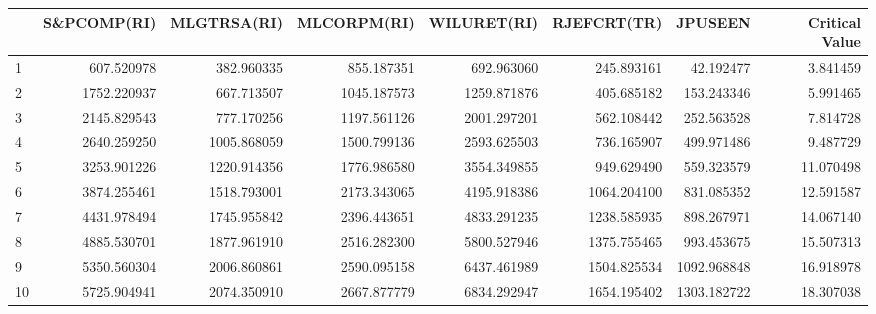 \begin{tabular}{lrrrrrrr}
\toprule
{} &  S\&PCOMP(RI) &  MLGTRSA(RI) &  MLCORPM(RI) &  WILURET(RI) &  RJEFCRT(TR) &      JPUSEEN &  Critical Value \\
\midrule
1  &   607.520978 &   382.960335 &   855.187351 &   692.963060 &   245.893161 &    42.192477 &        3.841459 \\
2  &  1752.220937 &   667.713507 &  1045.187573 &  1259.871876 &   405.685182 &   153.243346 &        5.991465 \\
3  &  2145.829543 &   777.170256 &  1197.561126 &  2001.297201 &   562.108442 &   252.563528 &        7.814728 \\
4  &  2640.259250 &  1005.868059 &  1500.799136 &  2593.625503 &   736.165907 &   499.971486 &        9.487729 \\
5  &  3253.901226 &  1220.914356 &  1776.986580 &  3554.349855 &   949.629490 &   559.323579 &       11.070498 \\
6  &  3874.255461 &  1518.793001 &  2173.343065 &  4195.918386 &  1064.204100 &   831.085352 &       12.591587 \\
7  &  4431.978494 &  1745.955842 &  2396.443651 &  4833.291235 &  1238.585935 &   898.267971 &       14.067140 \\
8  &  4885.530701 &  1877.961910 &  2516.282300 &  5800.527946 &  1375.755465 &   993.453675 &       15.507313 \\
9  &  5350.560304 &  2006.860861 &  2590.095158 &  6437.461989 &  1504.825534 &  1092.968848 &       16.918978 \\
10 &  5725.904941 &  2074.350910 &  2667.877779 &  6834.292947 &  1654.195402 &  1303.182722 &       18.307038 \\
\bottomrule
\end{tabular}
